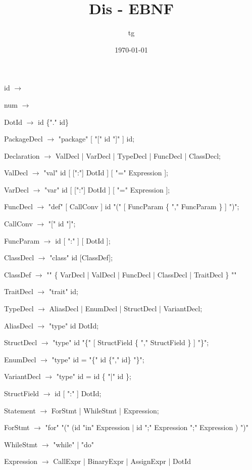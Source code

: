 \documentclass{article}
\title{Dis - EBNF}
\author{tg}
\date{\today}
\newcommand{\is}[0]{{$\rightarrow$ }}
\begin{document}
\begin{list}{}{}
\item id \is 
\item num \is
\item DotId \is id \{"." id\}

\item PackageDecl \is "package" [ "[" id "]" ] id;

\item Declaration \is ValDecl | VarDecl | TypeDecl | FuncDecl | ClassDecl;


\item ValDecl \is "val" id [ [":"] DotId ] [ "=" Expression ];
\item VarDecl \is "var" id [ [":"] DotId ] [ "=" Expression ];
\item FuncDecl \is "def" [  CallConv ] id "(" [ FuncParam  \{ "," FuncParam \} ] ")";
\item CallConv \is "[" id "]"; %
\item FuncParam \is id [ ":" ] [ DotId ];

\item ClassDecl \is "class" id  [ClassDef];
\item ClassDef \is "{" \{ VarDecl | ValDecl | FuncDecl | ClassDecl | TraitDecl \} "}"

\item TraitDecl \is "trait" id;

\item TypeDecl \is AliasDecl | EnumDecl | StructDecl | VariantDecl;
\item AliasDecl \is "type" id DotId;
\item StructDecl \is  "type" id "\{" [ StructField \{ "," StructField \} ] "\}";
\item EnumDecl  \is "type" id = "\{" id \{"," id\} "\}";
\item VariantDecl \is "type" id = id \{ "|" id \};

\item StructField \is id [ ":" ] DotId;

\item Statement \is ForStmt | WhileStmt | Expression;
\item ForStmt \is "for" "(" (id "in" Expression | id ";" Expression ";" Expression ) ")"
\item WhileStmt \is "while" | "do"


\item Expression \is CallExpr | BinaryExpr | AssignExpr | DotId


\end{list}
\end{document}
